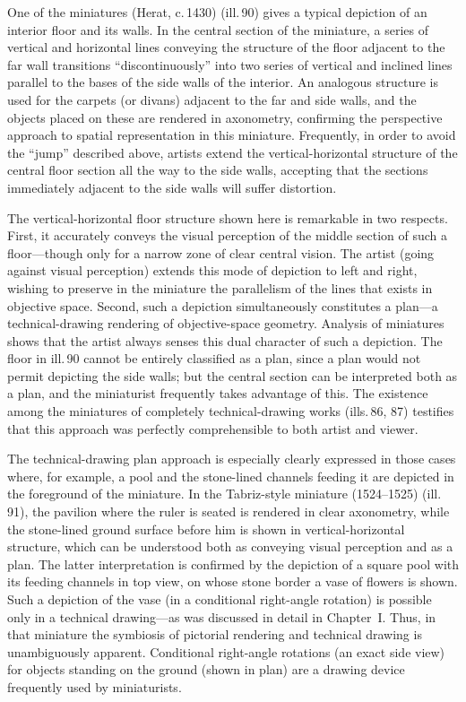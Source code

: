 One of the miniatures (Herat, c.\,1430) (ill.\,90) gives a typical depiction of an
interior floor and its walls. In the central section of the miniature, a series of
vertical and horizontal lines conveying the structure of the floor adjacent to the
far wall transitions ``discontinuously'' into two series of vertical and inclined
lines parallel to the bases of the side walls of the interior. An analogous
structure is used for the carpets (or divans) adjacent to the far and side walls,
and the objects placed on these are rendered in axonometry, confirming the
perspective approach to spatial representation in this miniature. Frequently, in
order to avoid the ``jump'' described above, artists extend the
vertical-horizontal structure of the central floor section all the way to the side
walls, accepting that the sections immediately adjacent to the side walls will
suffer distortion.

The vertical-horizontal floor structure shown here is remarkable in two respects.
First, it accurately conveys the visual perception of the middle section of such a
floor---though only for a narrow zone of clear central vision. The artist (going
against visual perception) extends this mode of depiction to left and right, wishing
to preserve in the miniature the parallelism of the lines that exists in objective
space. Second, such a depiction simultaneously constitutes a plan---a
technical-drawing rendering of objective-space geometry. Analysis of miniatures
shows that the artist always senses this dual character of such a depiction. The
floor in ill.\,90 cannot be entirely classified as a plan, since a plan would not
permit depicting the side walls; but the central section can be interpreted both as
a plan, and the miniaturist frequently takes advantage of this. The existence among
the miniatures of completely technical-drawing works (ills.\,86, 87) testifies that
this approach was perfectly comprehensible to both artist and viewer.



The technical-drawing plan approach is especially clearly expressed in those cases
where, for example, a pool and the stone-lined channels feeding it are depicted in
the foreground of the miniature. In the Tabriz-style miniature (1524--1525)
(ill.\,91), the pavilion where the ruler is seated is rendered in clear axonometry,
while the stone-lined ground surface before him is shown in vertical-horizontal
structure, which can be understood both as conveying visual perception and as a
plan. The latter interpretation is confirmed by the depiction of a square pool with
its feeding channels in top view, on whose stone border a vase of flowers is shown.
Such a depiction of the vase (in a conditional right-angle rotation) is possible
only in a technical drawing---as was discussed in detail in Chapter~I. Thus, in
that miniature the symbiosis of pictorial rendering and technical drawing is
unambiguously apparent. Conditional right-angle rotations (an exact side view) for
objects standing on the ground (shown in plan) are a drawing device frequently used
by miniaturists.


